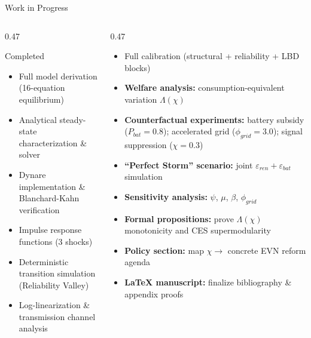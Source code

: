 \documentclass[aspectratio=169,10pt]{beamer}
\begin{document}
\begin{frame}{Work in Progress}
  \begin{columns}[T]
    \begin{column}{0.47\textwidth}
      \begin{block}{\textcolor{fuvteal}{Completed} \checkmark}
        \begin{itemize}\small
          \item Full model derivation (16-equation equilibrium)
          \item Analytical steady-state characterization \& solver
          \item Dynare implementation \& Blanchard-Kahn verification
          \item Impulse response functions (3 shocks)
          \item Deterministic transition simulation (Reliability Valley)
          \item Log-linearization \& transmission channel analysis
        \end{itemize}
      \end{block}
    \end{column}
    \begin{column}{0.47\textwidth}
      \begin{alertbox}[title=\textcolor{fuvred}{In Progress / Remaining}]
        \begin{itemize}\scriptsize
          \item Full calibration (structural + reliability + LBD blocks)
          \item \textbf{Welfare analysis:} consumption-equivalent variation $\Lambda(\chi)$
          \item \textbf{Counterfactual experiments:}
            battery subsidy ($P_{bat}=0.8$); accelerated grid ($\phi_{grid}=3.0$); signal suppression ($\chi=0.3$)
          \item \textbf{``Perfect Storm'' scenario:} joint $\varepsilon_{ren}+\varepsilon_{bat}$ simulation
          \item \textbf{Sensitivity analysis:} $\psi$, $\mu$, $\beta$, $\phi_{grid}$
          \item \textbf{Formal propositions:} prove $\Lambda(\chi)$ monotonicity and CES supermodularity
          \item \textbf{Policy section:} map $\chi\to$ concrete EVN reform agenda
          \item \textbf{LaTeX manuscript:} finalize bibliography \& appendix proofs
        \end{itemize}
      \end{alertbox}
    \end{column}
  \end{columns}
\end{frame}
\end{document}
